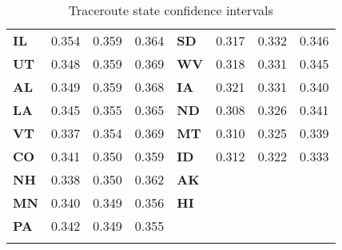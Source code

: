 \begin{longtable}{lrrr|lrrr}
\textbf{IL} &    0.354 & 0.359 &    0.364 & \textbf{SD} &    0.317 & 0.332 &    0.346 \\
\textbf{UT} &    0.348 & 0.359 &    0.369 & \textbf{WV} &    0.318 & 0.331 &    0.345 \\
\textbf{AL} &    0.349 & 0.359 &    0.368 & \textbf{IA} &    0.321 & 0.331 &    0.340 \\
\textbf{LA} &    0.345 & 0.355 &    0.365 & \textbf{ND} &    0.308 & 0.326 &    0.341 \\
\textbf{VT} &    0.337 & 0.354 &    0.369 & \textbf{MT} &    0.310 & 0.325 &    0.339 \\
\textbf{CO} &    0.341 & 0.350 &    0.359 & \textbf{ID} &    0.312 & 0.322 &    0.333 \\
\textbf{NH} &    0.338 & 0.350 &    0.362 & \textbf{AK} &          &       &          \\
\textbf{MN} &    0.340 & 0.349 &    0.356 & \textbf{HI} &          &       &          \\
\textbf{PA} &    0.342 & 0.349 &    0.355 &             &          &       & \\
\caption{Traceroute state confidence intervals}
\label{tab:traceroute_confidence_intervals}
\end{longtable}
